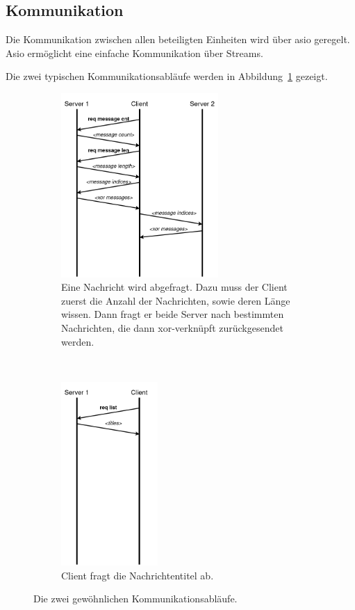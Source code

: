 \documentclass[]{article}
\begin{document}
\subsection{Kommunikation}
Die Kommunikation zwischen allen beteiligten Einheiten wird über asio geregelt. Asio ermöglicht eine einfache Kommunikation über Streams.

Die zwei typischen Kommunikationsabläufe werden in Abbildung~\ref{fig:communication_diagram} gezeigt.

\begin{figure}[t!]
	\centering
	\begin{subfigure}[t]{0.5\textwidth}
		\centering
		\includegraphics[height=7cm]{img/communication_index.png}
		\caption{Eine Nachricht wird abgefragt. Dazu muss der Client zuerst die Anzahl der Nachrichten, sowie deren Länge wissen. Dann fragt er beide Server nach bestimmten Nachrichten, die dann xor-verknüpft zurückgesendet werden.}
	\end{subfigure}%
	~ 
	\begin{subfigure}[t]{0.5\textwidth}
		\centering
		\includegraphics[height=7cm]{img/communication_list.png}
		\caption{Client fragt die Nachrichtentitel ab.}
	\end{subfigure}
	\caption{Die zwei gewöhnlichen Kommunikationsabläufe.}
	\label{fig:communication_diagram}
\end{figure}
\end{document}
